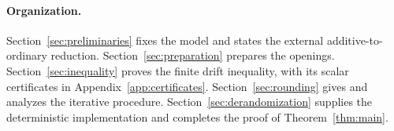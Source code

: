 \paragraph{Organization.}
Section~\ref{sec:preliminaries} fixes the model and states the external
additive-to-ordinary reduction. Section~\ref{sec:preparation} prepares the
openings. Section~\ref{sec:inequality} proves the finite drift inequality,
with its scalar certificates in Appendix~\ref{app:certificates}.
Section~\ref{sec:rounding} gives and analyzes the iterative procedure.
Section~\ref{sec:derandomization} supplies the deterministic implementation
and completes the proof of Theorem~\ref{thm:main}.

